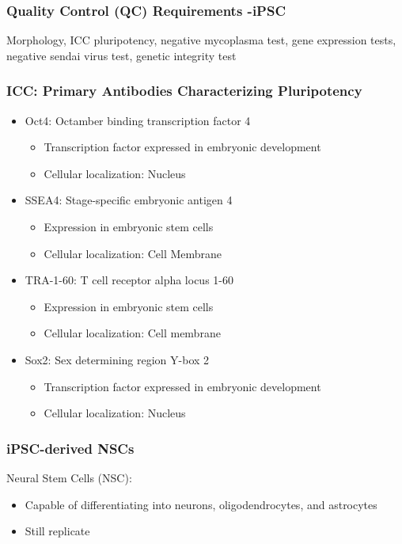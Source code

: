 \begin{itemize}
\subsubsection{Quality Control (QC) Requirements -iPSC}
Morphology, ICC pluripotency, negative mycoplasma test, gene expression tests, negative sendai virus test, genetic integrity test

\subsubsection{ICC: Primary Antibodies Characterizing Pluripotency}
\begin{itemize}
    \item Oct4: Octamber binding transcription factor 4
    \begin{itemize}
        \item Transcription factor expressed in embryonic development
        \item Cellular localization: Nucleus
    \end{itemize}
    \item SSEA4: Stage-specific embryonic antigen 4
    \begin{itemize}
        \item Expression in embryonic stem cells
        \item Cellular localization: Cell Membrane
    \end{itemize}
    \item TRA-1-60: T cell receptor alpha locus 1-60
    \begin{itemize}
        \item Expression in embryonic stem cells
        \item Cellular localization: Cell membrane
    \end{itemize}
    \item Sox2: Sex determining region Y-box 2
    \begin{itemize}
        \item Transcription factor expressed in embryonic development
        \item Cellular localization: Nucleus
    \end{itemize}
\end{itemize}

\subsubsection{iPSC-derived NSCs}
Neural Stem Cells (NSC): 
\begin{itemize}
    \item Capable of differentiating into neurons, oligodendrocytes, and astrocytes
    \item Still replicate
\end{itemize}

\end{itemize}
